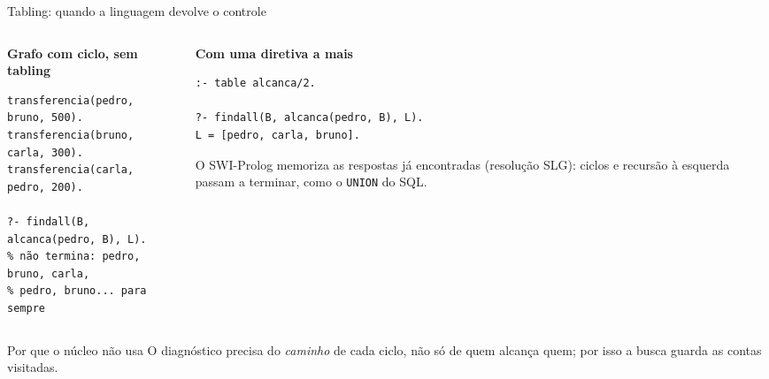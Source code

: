 \documentclass[aspectratio=169,11pt,xcolor=table]{beamer}
\begin{document}
\begin{frame}[fragile]{Tabling: quando a linguagem devolve o controle}
  \begin{columns}[T]
    \begin{column}{0.48\textwidth}
      \small\textbf{Grafo com ciclo, sem tabling}
\begin{lstlisting}[style=pl]
transferencia(pedro, bruno, 500).
transferencia(bruno, carla, 300).
transferencia(carla, pedro, 200).

?- findall(B, alcanca(pedro, B), L).
% não termina: pedro, bruno, carla,
% pedro, bruno... para sempre
\end{lstlisting}
    \end{column}
    \begin{column}{0.48\textwidth}
      \small\textbf{Com uma diretiva a mais}
\begin{lstlisting}[style=pl]
:- table alcanca/2.

?- findall(B, alcanca(pedro, B), L).
L = [pedro, carla, bruno].
\end{lstlisting}
      \vspace{4pt}
      \footnotesize
      O SWI-Prolog memoriza as respostas já encontradas (resolução SLG): ciclos e
      recursão à esquerda passam a terminar, como o \texttt{UNION} do SQL.
    \end{column}
  \end{columns}
  \vspace{8pt}
  \begin{block}{Por que o núcleo não usa}
    \small O diagnóstico precisa do \emph{caminho} de cada ciclo, não só de quem
    alcança quem; por isso a busca guarda as contas visitadas.
  \end{block}
\end{frame}
\end{document}
